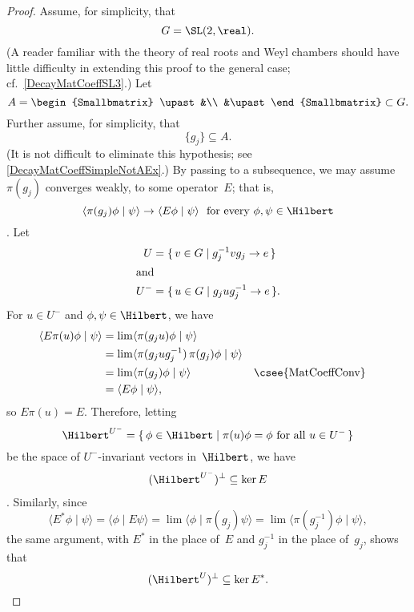 \begin{proof}
Assume, for simplicity, that 
	$$G = \SL(2,\real) .$$
(A reader familiar with the theory of real roots and Weyl chambers should have little difficulty in extending this proof to the general case; cf.~\cref{DecayMatCoeffSL3}.) Let
	$$ A = \begin{Smallbmatrix} \upast&\\ &\upast \end{Smallbmatrix} \subset G .$$
Further assume, for simplicity, that 
	$$ \{g_j\} \subseteq A .$$
(It is not difficult to eliminate this hypothesis; see \cref{DecayMatCoeffSimpleNotAEx}.)
 By passing to a subsequence, we may assume $\pi(g_j)$ converges weakly, to
some operator~$E$; that is,
 $$ \langle \pi(g_j) \phi \mid \psi \rangle
 \to \langle E \phi \mid \psi \rangle
 \mbox{ \ for every $\phi,\psi \in \Hilbert$} $$
 .
 Let 
 \begin{align} \label{horodefn}
 U &= \{\, v \in G \mid g_j^{-1} v g_j \to e \,\} \\
 \intertext{and} 
 U^- &= \{\, u \in G \mid g_j u g_j^{-1} \to e \,\} 
. \end{align}
 For $u \in U^-$ and $\phi,\psi \in \Hilbert$, we have
 \begin{align*}
 \langle E\pi(u) \phi \mid \psi \rangle
 &= \lim \langle \pi(g_j u) \phi \mid \psi \rangle
 \\&= \lim \langle \pi(g_j u g_j^{-1}) \, \pi(g_j) \phi \mid \psi \rangle
 \\&= \lim \langle \pi(g_j) \phi \mid \psi \rangle
 && \text{\csee{MatCoeffConv}}
 \\&= \langle E \phi \mid \psi \rangle 
 , \end{align*}
 so $E \pi(u) = E$. Therefore, letting 
 	$$\Hilbert^{U^-} = \{\, \phi \in \Hilbert \mid \text{$\pi(u) \phi = \phi$ for all $u \in U^-$} \,\} $$
be the space of $U^-$-invariant vectors in~$\Hilbert$, we have
 	\begin{align} \label{UperpInKer}
	(\Hilbert^{U^-})^\perp \subseteq \ker E
	\end{align}
.
Similarly, since
 $$ \langle E^* \phi \mid \psi \rangle
 =  \langle \phi \mid E \psi \rangle
 = \lim \langle \phi \mid \pi(g_j) \psi \rangle
 = \lim \langle \pi(g_j^{-1}) \phi \mid  \psi \rangle ,$$
the same argument, with $E^*$ in the place of~$E$ and $g_j^{-1}$ in the
place of~$g_j$, shows that 
	$$(\Hilbert^U)^\perp \subseteq \ker E^* .$$


\end{proof}
